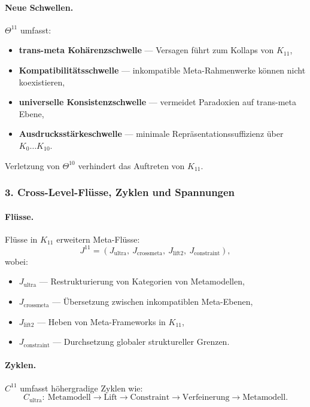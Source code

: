 \paragraph{Neue Schwellen.}
$\Theta^{11}$ umfasst:
\begin{itemize}
  \item \textbf{trans-meta Kohärenzschwelle} — Versagen führt zum Kollaps von $K_{11}$,
  \item \textbf{Kompatibilitätsschwelle} — inkompatible Meta-Rahmenwerke können
        nicht koexistieren,
  \item \textbf{universelle Konsistenzschwelle} — vermeidet Paradoxien auf
        trans-meta Ebene,
  \item \textbf{Ausdrucksstärkeschwelle} — minimale Repräsentationssuffizienz über
        $K_0\dots K_{10}$.
\end{itemize}

Verletzung von $\Theta^{10}$ verhindert das Auftreten von $K_{11}$.

\subsubsection{3. Cross-Level-Flüsse, Zyklen und Spannungen}

\paragraph{Flüsse.}
Flüsse in $K_{11}$ erweitern Meta-Flüsse:
\[
J^{11} = (J_{\mathrm{ultra}},\ J_{\mathrm{crossmeta}},\
         J_{\mathrm{lift2}},\ J_{\mathrm{constraint}}),
\]
wobei:
\begin{itemize}
  \item $J_{\mathrm{ultra}}$ — Restrukturierung von Kategorien von Metamodellen,
  \item $J_{\mathrm{crossmeta}}$ — Übersetzung zwischen inkompatiblen Meta-Ebenen,
  \item $J_{\mathrm{lift2}}$ — Heben von Meta-Frameworks in $K_{11}$,
  \item $J_{\mathrm{constraint}}$ — Durchsetzung globaler struktureller Grenzen.
\end{itemize}

\paragraph{Zyklen.}
$C^{11}$ umfasst höhergradige Zyklen wie:
\[
C_{\mathrm{ultra}}:\
\text{Metamodell} \rightarrow \text{Lift} \rightarrow \text{Constraint}
\rightarrow \text{Verfeinerung} \rightarrow \text{Metamodell}.
\]

